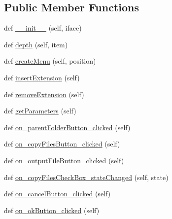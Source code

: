 \subsection*{Public Member Functions}
\begin{DoxyCompactItemize}
\item 
def \mbox{\hyperlink{class_dsg_tools_1_1_inventory_tools_1_1inventory_tools_1_1_inventory_tools_ac27f158d879dd73dc7f4564d6e419e68}{\+\_\+\+\_\+init\+\_\+\+\_\+}} (self, iface)
\item 
def \mbox{\hyperlink{class_dsg_tools_1_1_inventory_tools_1_1inventory_tools_1_1_inventory_tools_ae5e3d8c75b14858504e8acc404dbf89e}{depth}} (self, item)
\item 
def \mbox{\hyperlink{class_dsg_tools_1_1_inventory_tools_1_1inventory_tools_1_1_inventory_tools_ad2eacea7f239cce9518b8096a51cd9ed}{create\+Menu}} (self, position)
\item 
def \mbox{\hyperlink{class_dsg_tools_1_1_inventory_tools_1_1inventory_tools_1_1_inventory_tools_a9cb93926117e29913885ec0f35ebe83c}{insert\+Extension}} (self)
\item 
def \mbox{\hyperlink{class_dsg_tools_1_1_inventory_tools_1_1inventory_tools_1_1_inventory_tools_aa4ce23cbaf7b5c1c23e11e1925cefae9}{remove\+Extension}} (self)
\item 
def \mbox{\hyperlink{class_dsg_tools_1_1_inventory_tools_1_1inventory_tools_1_1_inventory_tools_aa4d7701ae4d0895e7818e91e53722c77}{get\+Parameters}} (self)
\item 
def \mbox{\hyperlink{class_dsg_tools_1_1_inventory_tools_1_1inventory_tools_1_1_inventory_tools_a649ffb9c920baee6c52f8477c9fc3a0e}{on\+\_\+parent\+Folder\+Button\+\_\+clicked}} (self)
\item 
def \mbox{\hyperlink{class_dsg_tools_1_1_inventory_tools_1_1inventory_tools_1_1_inventory_tools_afee3b21261984ff608ff1283a46191b9}{on\+\_\+copy\+Files\+Button\+\_\+clicked}} (self)
\item 
def \mbox{\hyperlink{class_dsg_tools_1_1_inventory_tools_1_1inventory_tools_1_1_inventory_tools_a59555f35e462d65997feb8394e97d6aa}{on\+\_\+output\+File\+Button\+\_\+clicked}} (self)
\item 
def \mbox{\hyperlink{class_dsg_tools_1_1_inventory_tools_1_1inventory_tools_1_1_inventory_tools_a79a97b80b8689bec11f971afb0e81a55}{on\+\_\+copy\+Files\+Check\+Box\+\_\+state\+Changed}} (self, state)
\item 
def \mbox{\hyperlink{class_dsg_tools_1_1_inventory_tools_1_1inventory_tools_1_1_inventory_tools_aa776be8684ed702367fbfb08257d7e07}{on\+\_\+cancel\+Button\+\_\+clicked}} (self)
\item 
def \mbox{\hyperlink{class_dsg_tools_1_1_inventory_tools_1_1inventory_tools_1_1_inventory_tools_ab6686746678e39bdf6d5e28713dcdd66}{on\+\_\+ok\+Button\+\_\+clicked}} (self)
\end{DoxyCompactItemize}
